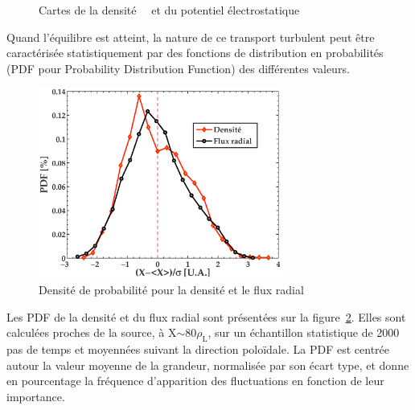 \begin{refsection}
\begin{figure}[!htbp]
    \centering
    \caption{Cartes de la densité ~~et du potentiel
    électrostatique
    }
    \label{2-CartesBase}
\end{figure}

Quand l'équilibre est atteint, la nature de ce transport turbulent peut être
caractérisée statistiquement par des fonctions de distribution en probabilités
(PDF pour Probability Distribution Function) des différentes valeurs. 
 \begin{figure}[!htbp]
\centering
    \includegraphics[width=8cm]{figures/2-PDFBase.eps}
    \caption{Densité de probabilité pour la densité et le flux radial}
    \label{2-PDFBase}
\end{figure}
 Les PDF
de la densité et du flux radial sont présentées sur la figure~\ref{2-PDFBase}. Elles
sont calculées proches de la source, à X$\sim$80$\rho_\text{L}$, sur un
échantillon statistique de 2000 pas de temps et moyennées suivant la direction
poloïdale. La PDF est centrée autour la valeur moyenne de la grandeur,
normalisée par son écart type, et donne en pourcentage la fréquence d'apparition
des fluctuations en fonction de leur importance.



\end{refsection}
